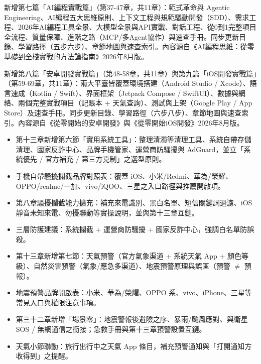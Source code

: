 
新增第七篇「AI編程實戰篇」（第37-47章，共11章）：範式革命與 Agentic Engineering、AI編程五大思維原則、上下文工程與規範驅動開發（SDD）、需求工程、2026年AI編程工具全景、大模型全景與API實戰、對話工程、從0到1完整項目全流程、質量保障、進階之路（MCP/多Agent協作）與速查手冊。同步更新目錄、學習路徑（五步六步）、章節地圖與速查索引。內容源自《AI編程思維：從零基礎到全棧實戰的方法論指南》2026年8月版。

新增第八篇「安卓開發實戰篇」（第48-58章，共11章）與第九篇「iOS開發實戰篇」（第59-69章，共11章）：兩大平臺皆覆蓋環境搭建（Android Studio / Xcode）、語言速成（Kotlin / Swift）、界面框架（Jetpack Compose / SwiftUI）、數據與網絡、兩個完整實戰項目（記賬本 + 天氣查詢）、測試與上架（Google Play / App Store）及速查手冊。同步更新目錄、學習路徑（六步八步）、章節地圖與速查索引。內容源自《從零開始的安卓開發》與《從零開始iOS開發》2026年8月版。


\begin{itemize}
  \item 第十三章新增第六節「實用系統工具」：整理清濁等清理工具、系統自帶存儲清理、國家反詐中心、品牌手機管家、運營商防騷擾與 AdGuard，並立「系統優先 / 官方補充 / 第三方克制」之選型原則。
  \item 手機自帶騷擾攔截品牌對照表：覆蓋 iOS、小米/Redmi、華為/榮耀、OPPO/realme/一加、vivo/iQOO、三星之入口路徑與推薦開啟項。
  \item 第八章騷擾攔截能力擴充：補充來電識別、黑白名單、短信關鍵詞過濾、iOS 靜音未知來電、勿擾聯動等實操說明，並與第十三章互鏈。
  \item 三層防護建議：系統攔截 + 運營商防騷擾 + 國家反詐中心，強調白名單防誤殺。
\end{itemize}


\begin{itemize}
  \item 第十三章新增第七節：天氣預警（官方氣象渠道 + 系統天氣 App + 顏色等級）、自然災害預警（氣象/應急多渠道）、地震預警原理與誤區（預警 $\neq$ 預報）。
  \item 地震預警品牌開啟表：小米、華為/榮耀、OPPO 系、vivo、iPhone、三星等常見入口與權限注意事項。
  \item 第三十二章新增「場景零」：地震警報後避險之序、暴雨/颱風應對、與衛星 SOS / 無網通信之銜接；急救手冊與第十三章預警設置互鏈。
  \item 天氣小節聯動：旅行出行中之天氣 App 條目，補充預警通知與「打開通知方收得到」之提醒。
\end{itemize}

